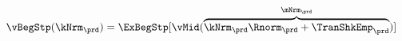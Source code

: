   \begin{equation}\begin{gathered}\begin{aligned}
        \vBegStp(\kNrm_{\prd}) & = \ExBegStp[\vMid(\overbrace{\kNrm_{\prd} \Rnorm_{\prd} + \TranShkEmp_{\prd}}^{\mNrm_{\prd}})]  \label{eq:vBegStp}
      \end{aligned}\end{gathered}\end{equation}
